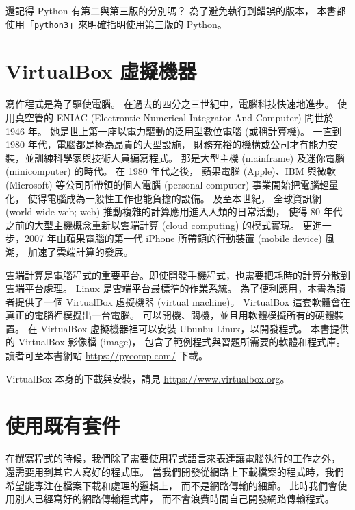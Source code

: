 \documentclass[a4paper,12pt]{book}
\theoremstyle{definition}
\begin{document}
還記得 Python 有第二與第三版的分別嗎？
為了避免執行到錯誤的版本，
本書都使用「\verb+python3+」來明確指明使用第三版的 Python。

\section{VirtualBox 虛擬機器}
%
\label{c:runtime:vbox}

寫作程式是為了驅使電腦。
在過去的四分之三世紀中，電腦科技快速地進步。
使用真空管的 ENIAC (Electrontic Numerical Integrator And Computer)
問世於 1946 年。
她是世上第一座以電力驅動的泛用型數位電腦 (或稱計算機)。
一直到 1980 年代，電腦都是極為昂貴的大型設施，
財務充裕的機構或公司才有能力安裝，並訓練科學家與技術人員編寫程式。
那是大型主機 (mainframe) 及迷你電腦 (minicomputer) 的時代。
在 1980 年代之後，
蘋果電腦 (Apple)、IBM 與微軟 (Microsoft) 等公司所帶領的個人電腦 (personal computer) 事業開始把電腦輕量化，
使得電腦成為一般性工作也能負擔的設備。
及至本世紀，
全球資訊網 (world wide web; web) 推動複雜的計算應用進入人類的日常活動，
使得 80 年代之前的大型主機概念重新以雲端計算 (cloud computing) 的模式實現。
更進一步，2007 年由蘋果電腦的第一代 iPhone 所帶領的行動裝置 (mobile device) 風潮，
加速了雲端計算的發展。


雲端計算是電腦程式的重要平台。即使開發手機程式，也需要把耗時的計算分散到雲端平台處理。
Linux 是雲端平台最標準的作業系統。
為了便利應用，本書為讀者提供了一個 VirtualBox 虛擬機器 (virtual machine)。
VirtualBox 這套軟體會在真正的電腦裡模擬出一台電腦。
可以開機、關機，並且用軟體模擬所有的硬體裝置。
在 VirtualBox 虛擬機器裡可以安裝 Ubunbu Linux，以開發程式。
本書提供的 VirtualBox 影像檔 (image)，
包含了範例程式與習題所需要的軟體和程式庫。
讀者可至本書網站 \url{https://pycomp.com/} 下載。

VirtualBox 本身的下載與安裝，請見 \url{https://www.virtualbox.org}。

\section{使用既有套件}
%
\label{c:runtime:package}

在撰寫程式的時候，我們除了需要使用程式語言來表達讓電腦執行的工作之外，
還需要用到其它人寫好的程式庫。
當我們開發從網路上下載檔案的程式時，我們希望能專注在檔案下載和處理的邏輯上，
而不是網路傳輸的細節。
此時我們會使用別人已經寫好的網路傳輸程式庫，
而不會浪費時間自己開發網路傳輸程式。
\end{document}
